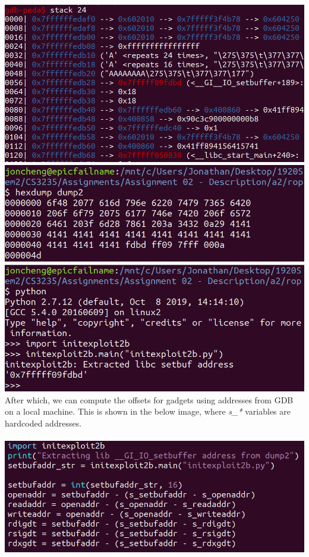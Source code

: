\documentclass[12pt]{article}
\begin{document}
\includegraphics[scale=0.7]{./a2/rop/stack24_libc.PNG}\\
\includegraphics[scale=0.7]{./a2/rop/dump2.PNG}\\
\includegraphics[scale=0.7]{./a2/rop/dump2_ext.PNG}\\

After which, we can compute the offsets for gadgets using addresses from GDB on a local machine. This is shown in the below image, where \emph{s\_*} variables are hardcoded addresses.\\\\

\includegraphics[scale=0.7]{./a2/rop/calclibc.PNG}\\
\end{document}
